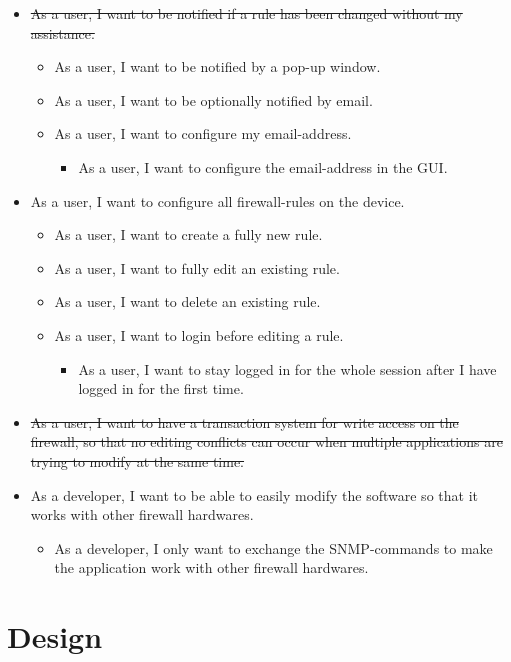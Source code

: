 \documentclass[11pt, a4paper]{article}
\begin{document}
\begin{itemize}
\item \sout{As a user, I want to be notified if a rule has been changed without my assistance.}
\begin{itemize}
\item As a user, I want to be notified by a pop-up window.
\item As a user, I want to be optionally notified by email.
\item As a user, I want to configure my email-address.
\begin{itemize}
\item As a user, I want to configure the email-address in the GUI.
\end{itemize}
\end{itemize}
\item As a user, I want to configure all firewall-rules on the device.
\begin{itemize}
\item As a user, I want to create a fully new rule.
\item As a user, I want to fully edit an existing rule.
\item As a user, I want to delete an existing rule.
\item As a user, I want to login before editing a rule.
\begin{itemize}
\item As a user, I want to stay logged in for the whole session after I have logged in for the first time.
\end{itemize}
\end{itemize}
\item \sout{As a user, I want to have a transaction system for write access on the firewall, so that no editing conflicts can occur when multiple applications are trying to modify at the same time.}
\item As a developer, I want to be able to easily modify the software so that it works with other firewall hardwares.
\begin{itemize}
\item As a developer, I only want to exchange the SNMP-commands to make the application work with other firewall hardwares.
\end{itemize}
\end{itemize}

\section{Design}
\end{document}
